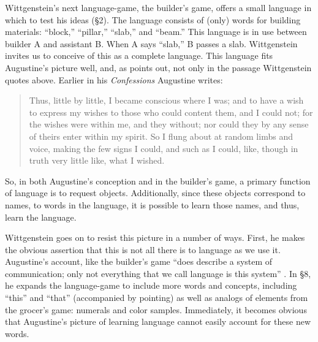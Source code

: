\documentclass[man,12pt,natbib]{apa6}
\begin{document}
Wittgenstein's next language-game, the builder's game, offers a small language
in which to test 
%
%
his ideas (\S 2). The language consists of (only) words for
building materials: ``block,'' ``pillar,'' ``slab,'' and ``beam.'' This
language is in use between builder A and assistant B. When A says ``slab,'' B
passes a slab. Wittgenstein invites us to conceive of this as a complete
language. This language fits Augustine's picture well, and, as \citet{McGinn97}
points out, not only in the passage Wittgenstein quotes above. Earlier in his
\emph{Confessions} Augustine writes:
\begin{quote}
	Thus, little by little, I became conscious where I was; and to have a wish
	to express my wishes to those who could content them, and I could not; for
	the wishes were within me, and they without; nor could they by any sense of
	theirs enter within my spirit. So I flung about at random limbs and voice,
	making the few signs I could, and such as I could, like, though in truth
	very little like, what I wished. \cite[\S 1.6.8]{Pusey09}
\end{quote}
So, in both Augustine's conception and in the builder's game, a
primary function of language is to request objects. Additionally, since these
objects correspond to names, to words in the language, it is possible to learn
those names, and thus, learn the language.

Wittgenstein goes on to resist this picture in a number of ways. First, he
makes the obvious assertion that this is not all there is to language as we use
it. Augustine's account, like the builder's game ``does describe a system of
communication; only not everything that we call language is this system''
\cite[\S 3]{Wittgenstein53}. In \S 8, he expands the language-game to include
more words and concepts, including ``this'' and ``that'' (accompanied by
pointing) as well as analogs of elements from the grocer's game: numerals and
color samples. Immediately, it becomes obvious that Augustine's picture of
learning language cannot easily account for these new words.
\end{document}
